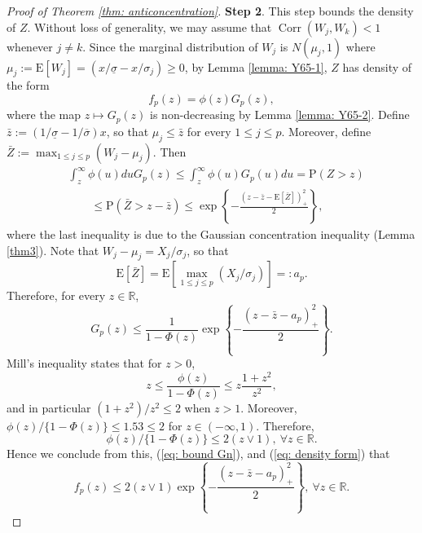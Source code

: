 \documentclass[11pt,reqno]{amsart}
\theoremstyle{definition}
\newcommand{\Ep}{{\mathrm{E}}}
\renewcommand{\Pr}{{\mathrm{P}}}
\newcommand{\RR}{\mathbb{R}}
\DeclareMathOperator{\Corr}{Corr}
\begin{document}
\begin{proof}[Proof of Theorem \ref{thm: anticoncentration}]
{\bf Step 2}. This step bounds the density of $Z$.
Without loss of generality, we may assume  that $\Corr (W_{j},W_{k})<1$ whenever $j \neq k$. Since the marginal distribution of $W_{j}$ is $N(\mu_{j},1)$ where $\mu_{j}:=\Ep[W_{j}]=(x/\underline{\sigma}-x/\sigma_j)\geq 0$, by Lemma \ref{lemma: Y65-1}, $Z$ has density of the form
\begin{equation}\label{eq: density form}
f_{p}(z) = \phi(z) G_{p} (z),
\end{equation}
where the map $z \mapsto G_{p}(z)$ is non-decreasing by Lemma \ref{lemma: Y65-2}. Define $\bar{z}:= (1/\underline{\sigma}-1/\overline{\sigma})x$, so that $\mu_{j}\leq \bar{z}$ for every $1 \leq j \leq p$. Moreover, define $\bar{Z}:=\max_{1 \leq j \leq p}(W_{j}-\mu_{j})$.  Then
\begin{align*}
&\int_{z}^{\infty} \phi (u) du G_{p}(z) \leq \int_{z}^{\infty} \phi(u) G_{p}(u) du = \Pr( Z> z) \\
&\qquad \leq \Pr( \bar{Z} > z - \bar{z} ) \leq  \exp \left \{ -\frac{(z-\bar{z}-\Ep[ \bar{Z}  ])_{+}^{2}}{2} \right \},
\end{align*}
where the last inequality is due to the Gaussian concentration inequality (Lemma \ref{thm3}).
Note that $W_{j}-\mu_{j}=X_{j}/\sigma_{j}$, so that
\begin{equation*}
\Ep[\bar{Z}]=\Ep [ \max_{1 \leq j \leq p}(X_{j}/\sigma_{j}) ] =: a_p.
\end{equation*}
Therefore, for every $z \in \RR$,
\begin{equation}\label{eq: bound Gn}
G_{p} (z) \leq \frac{1}{1-\Phi(z)} \exp \left \{ -\frac{(z-\bar{z}-a_p)_{+}^{2}}{2} \right \}.
\end{equation}
Mill's inequality states that for $z>0$,
\begin{equation*}
z \leq \frac{\phi(z)}{1-\Phi (z)}\leq z \frac{1+z^2}{z^2},
\end{equation*}
and in particular $(1+z^2)/z^2 \leq 2$ when $z>1$. Moreover, $\phi(z)/\{ 1-\Phi(z) \}\leq 1.53 \leq 2 $ for  $z \in (-\infty, 1)$.  Therefore,
\begin{equation*}
\phi(z)/\{ 1-\Phi(z) \} \leq 2 (z \vee 1),  \ \forall z \in \RR.
\end{equation*}
Hence we conclude from this, (\ref{eq: bound Gn}), and (\ref{eq: density form}) that
\begin{equation*}
f_{p}(z) \leq 2(z \vee 1) \exp \left \{  -\frac{(z-\bar{z}-a_p)_{+}^{2}}{2} \right \}, \ \forall z \in \RR.
\end{equation*}



\end{proof}
\end{document}
